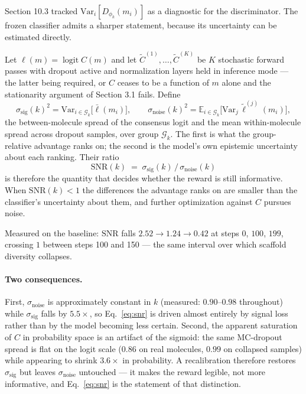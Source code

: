 \documentclass[11pt]{article}
\newcommand{\E}{\mathbb{E}}
\newcommand{\1}{\mathbb{1}}
\begin{document}
Section 10.3 tracked $\mathrm{Var}_i[D_{\phi_k}(m_i)]$ as a diagnostic for
the discriminator. The frozen classifier admits a sharper statement,
because its uncertainty can be estimated directly.

Let $\ell(m) = \operatorname{logit} C(m)$ and let $\tilde{C}^{(1)},\dots,
\tilde{C}^{(K)}$ be $K$ stochastic forward passes with dropout active and
normalization layers held in inference mode --- the latter being required,
or $C$ ceases to be a function of $m$ alone and the stationarity argument
of Section 3.1 fails. Define
\begin{equation}
\sigma_{\mathrm{sig}}(k)^2 = \mathrm{Var}_{i \in \mathcal{G}_k}\big[\bar\ell(m_i)\big],
\qquad
\sigma_{\mathrm{noise}}(k)^2 = \E_{i \in \mathcal{G}_k}\big[\mathrm{Var}_j\,\tilde\ell^{(j)}(m_i)\big],
\label{eq:snrdef}
\end{equation}
the between-molecule spread of the consensus logit and the mean
within-molecule spread across dropout samples, over group $\mathcal{G}_k$.
The first is what the group-relative advantage ranks on; the second is the
model's own epistemic uncertainty about each ranking. Their ratio
\begin{equation}
\mathrm{SNR}(k) \;=\; \sigma_{\mathrm{sig}}(k) \,/\, \sigma_{\mathrm{noise}}(k)
\label{eq:snr}
\end{equation}
is therefore the quantity that decides whether the reward is still
informative. When $\mathrm{SNR}(k) < 1$ the differences the advantage ranks
on are smaller than the classifier's uncertainty about them, and further
optimization against $C$ pursues noise.

Measured on the baseline: $\mathrm{SNR}$ falls $2.52 \to 1.24 \to 0.42$ at
steps $0$, $100$, $199$, crossing $1$ between steps 100 and 150 --- the
same interval over which scaffold diversity collapses.

\paragraph{Two consequences.} First, $\sigma_{\mathrm{noise}}$ is
approximately constant in $k$ (measured: $0.90$--$0.98$ throughout) while
$\sigma_{\mathrm{sig}}$ falls by $5.5\times$, so Eq.~\eqref{eq:snr} is
driven almost entirely by signal loss rather than by the model becoming
less certain. Second, the apparent saturation of $C$ in probability space
is an artifact of the sigmoid: the same MC-dropout spread is flat on the
logit scale ($0.86$ on real molecules, $0.99$ on collapsed samples) while
appearing to shrink $3.6\times$ in probability. A recalibration therefore
restores $\sigma_{\mathrm{sig}}$ but leaves $\sigma_{\mathrm{noise}}$
untouched --- it makes the reward legible, not more informative, and
Eq.~\eqref{eq:snr} is the statement of that distinction.
\end{document}
